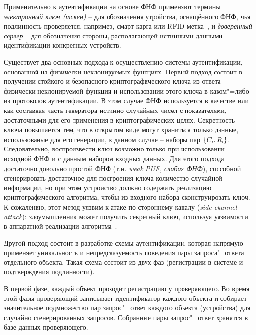 Применительно к аутентификации на основе ФНФ применяют термины \emph{электронный ключ (токен)} -- для обозначения утройства, оснащённого ФНФ, чья подлинность проверяется, например, смарт-карта или RFID-метка~\cite{rfid_puf}, и \emph{доверенный сервер} -- для обозначения стороны, располагающей истинными данными идентификации конкретных устройств.

Существует два основных подхода к осуществлению системы аутентификации, основанной на физически неклонируемых функциях. Первый подход состоит в получении стойкого и безопасного криптографического ключа из ответа физически неклонируемой функции и использовании этого ключа в каком"=либо из протоколов аутентификации. В этом случае ФНФ используется в качестве или как составная часть генератора истинно случайных чисел с показателями, достаточными для его применения в криптографических целях. Секретность ключа повышается тем, что в открытом виде могут храниться только данные, использованые для его генерации, в данном случае -- наборы пар $\left\{C_i, R_i\right\}$. Следовательно, воспроизвести ключ возможно только при использовании исходной ФНФ и с данным набором входных данных. Для этого подхода достаточно довольно простой ФНФ (т.н. \emph{weak PUF, слабая ФНФ}), способной сгенерировать достаточное для построения ключа количество случайной информации, но при этом устройство должно содержать реализацию криптографического алгоритма, чтобы из входного набора сконструировать ключ. К сожалению, этот метод уязвим к атаке по стороннему каналу (\emph{side-channel attack}): злоумышленник может получить секретный ключ, используя уязвимости в аппаратной реализации алгоритма~\cite{pufbased_auth,puf_cryptography}.

Другой подход состоит в разработке схемы аутентификации, которая напрямую применяет уникальность и непредсказуемость поведения пары запроса"=ответа отдельного объекта. Такая схема состоит из двух фаз (регистрации в системе и подтверждения подлинности).

В первой фазе, каждый объект проходит регистрацию у проверяющего. Во время этой фазы проверяющий записывает идентификатор каждого объекта и собирает значительное подмножество пар запрос"=ответ каждого объекта (устройства) для случайно сгенерированных запросов. Собранные пары запрос"=ответ хранятся в базе данных проверяющего.

